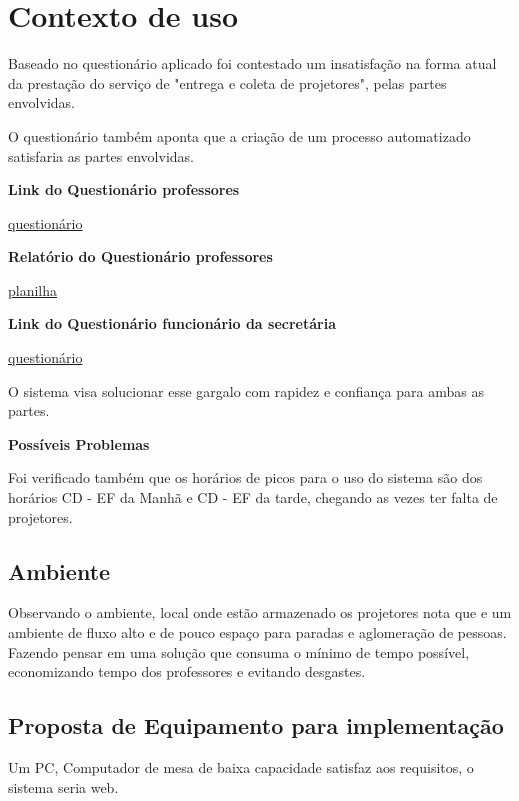 \section{Contexto de uso}
\hspace{2.0cm}

Baseado no questionário aplicado foi contestado um insatisfação na forma atual
da prestação do serviço de "entrega e coleta de projetores", pelas partes
envolvidas. 

O questionário também aponta que a criação de um processo automatizado
satisfaria as partes envolvidas. 

\begin{center}
  \textbf{Link do Questionário professores}
  
  \href{https://goo.gl/forms/FzfGAn2JHJQKLoEq1}{questionário}

  \textbf{Relatório do Questionário professores}
  
  \href{https://goo.gl/S1c97v}{planilha}

  \textbf{Link do Questionário funcionário da secretária}

  \href{https://goo.gl/forms/FzfGAn2JHJQKLoEq1}{questionário}

\end{center}


O sistema visa solucionar esse gargalo com rapidez e confiança para ambas as
partes. 


\textbf{Possíveis Problemas}

Foi verificado também que os horários de picos para o uso do sistema são dos
horários CD - EF da Manhã e CD - EF da tarde, chegando as vezes ter falta de 
projetores. 


\subsection{Ambiente}

Observando o ambiente, local onde estão armazenado os projetores nota que e um
ambiente de fluxo alto e de pouco espaço para paradas e aglomeração de pessoas.
Fazendo pensar em uma solução que consuma o mínimo de tempo possível,
economizando tempo dos professores e evitando desgastes. 


\subsection{Proposta de Equipamento para implementação}

Um PC, Computador de mesa de baixa capacidade satisfaz aos requisitos, o sistema
seria web. 


